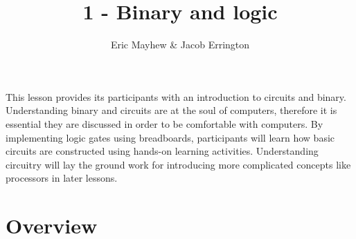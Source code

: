 \documentclass[11pt]{article}
\title{1 - Binary and logic}
\author{Eric Mayhew \& Jacob Errington}
\date{}
\begin{document}
\maketitle
This lesson provides its participants with an introduction to circuits and
binary. Understanding binary and circuits are at the soul of computers,
therefore it is essential they are discussed in order to be comfortable with
computers. By implementing logic gates using breadboards, participants will learn how basic circuits are
constructed using hands-on learning activities. Understanding circuitry will lay the ground work for
introducing more complicated concepts like processors in later lessons.

\section*{Overview}
\end{document}
